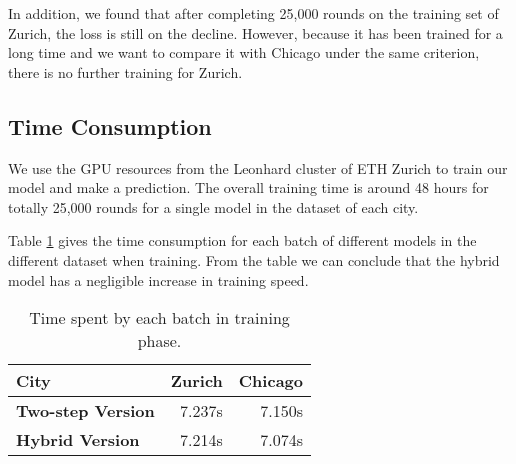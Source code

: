 In addition, we found that after completing 25,000 rounds on the training set of Zurich, the loss is still on the decline. However, because it has been trained for a long time and we want to compare it with Chicago under the same criterion, there is no further training for Zurich.

\subsection{Time Consumption}\label{tmcsmp}
We use the GPU resources from the Leonhard cluster of ETH Zurich to train our model and make a prediction. The overall training time is around 48 hours for totally 25,000 rounds for a single model in the dataset of each city.

Table \ref{tab:timetrain} gives the time consumption for each batch of different models in the different dataset when training. From the table we can conclude that the hybrid model has a negligible increase in training speed.
\begin{table}[!h]
	\centering
	\caption[Time spent by each batch in training phase]{Time spent by each batch in training phase.}
	\label{tab:timetrain}
	\begin{tabular}{l|r r}
	\hline
	\textbf{City} & Zurich & Chicago \\
	\hline
	\textbf{Two-step Version} & 7.237s & 7.150s \\
	\textbf{Hybrid Version} & 7.214s & 7.074s \\
	\hline
	\end{tabular}
\end{table}


